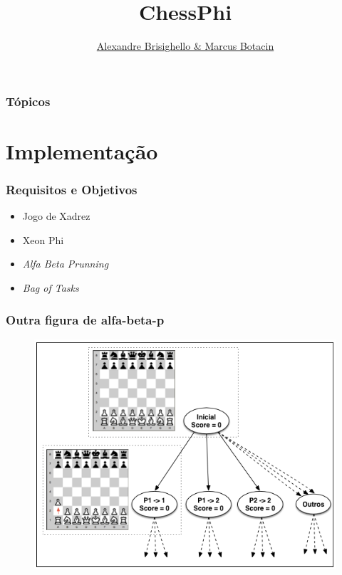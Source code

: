 \documentclass[yellow]{beamer}
\title{ChessPhi}
\author{\underline{Alexandre Brisighello \& Marcus Botacin}}
\begin{document}
\frame{
	\titlepage
}


\begin{frame}
 \frametitle{Tópicos}
 \tableofcontents
\end{frame}

\section{Implementação}


\begin{frame}
  \frametitle{Requisitos e Objetivos}

\begin{itemize}
\item Jogo de Xadrez
\item Xeon Phi
\item \textit{Alfa Beta Prunning}
\item \textit{Bag of Tasks}
\end{itemize}
\end{frame}

\begin{frame}
\frametitle{Outra figura de alfa-beta-p}
\begin{figure}[H]
\centering
\includegraphics[scale=1]{../docs/chess.png}
\end{figure}
\end{frame}
\end{document}
